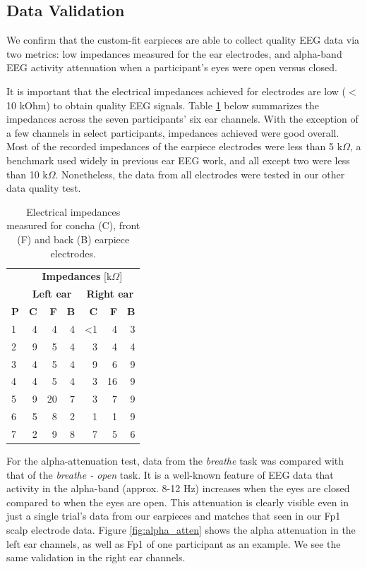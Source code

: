 \documentclass[a4paper,twoside]{article}
\begin{document}
\subsection{Data Validation}

\noindent We confirm that the custom-fit earpieces are able to collect quality EEG data via two metrics: low impedances measured for the ear electrodes, and alpha-band EEG activity attenuation when a participant's eyes were open versus closed.

It is important that the electrical impedances achieved for electrodes are low ($<$10 kOhm) to obtain quality EEG signals. Table \ref{tab:impedances} below summarizes the impedances across the seven participants' six ear channels. With the exception of a few channels in select participants, impedances achieved were good overall. Most of the recorded impedances of the earpiece electrodes were less than 5 k\(\Omega\), a benchmark used widely in previous ear EEG work, and all except two were less than 10 k\(\Omega\). Nonetheless, the data from all electrodes were tested in our other data quality test.

\begin{table}[h]
\caption{Electrical impedances measured for concha (C), front (F) and back (B) earpiece electrodes.}
\label{tab:impedances}
\begin{center}
\begin{tabular}{lrrrrrr}
& \multicolumn{6}{c}{\textbf{Impedances} [k\(\Omega\)]} \\
\cline{2-7}
& \multicolumn{3}{|c|}{\textbf{Left ear}} & \multicolumn{3}{c|}{\textbf{Right ear}} \\
\textbf{P} & \textbf{C} & \textbf{F} & \textbf{B} & \textbf{C} & \textbf{F} & \textbf{B} \\
\hline
1 & 4 & 4 & 4 & \textless1 & 4 & 3\\
2 & 9 & 5 & 4 & 3 & 4 & 4\\
3 & 4 & 5 & 4 & 9 & 6 & 9\\
4 & 4 & 5 & 4 & 3 & 16 & 9\\
5 & 9 & 20 & 7 & 3 & 7 & 9\\
6 & 5 & 8 & 2 & 1 & 1 & 9\\
7 & 2 & 9 & 8 & 7 & 5 & 6\\
\end{tabular}
\end{center}
\end{table}

For the alpha-attenuation test, data from the \textit{breathe} task was compared with that of the \textit{breathe - open} task. It is a well-known feature of EEG data that activity in the alpha-band (approx. 8-12 Hz) increases when the eyes are closed compared to when the eyes are open. This attenuation is clearly visible even in just a single trial's data from our earpieces and matches that seen in our Fp1 scalp electrode data. Figure \ref{fig:alpha_atten} shows the alpha attenuation in the left ear channels, as well as Fp1 of one participant as an example. We see the same validation in the right ear channels.
\end{document}
